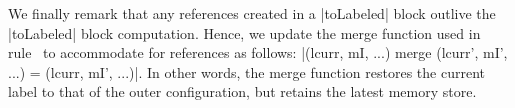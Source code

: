 We finally remark that any references created in a |toLabeled| block outlive
the |toLabeled| block computation.
%
Hence, we update the merge function used in rule~ to
accommodate for references as follows:
|(lcurr, mI, ...) merge (lcurr', mI', ...) = (lcurr, mI', ...)|.
%
In other words, the merge function restores the current label to that of the
outer configuration, but retains the latest memory store.



